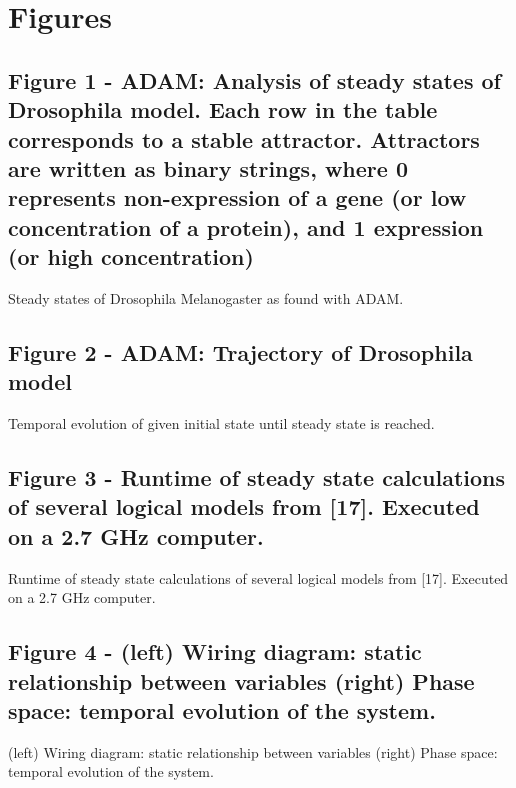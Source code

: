 \documentclass[10pt]{bmc_article}
\newenvironment{bmcformat}{\begin{raggedright}\baselineskip20pt\sloppy\setboolean{publ}{false}}{\end{raggedright}\baselineskip20pt\sloppy}
\begin{document}
\begin{bmcformat}
{
   }     %





\section*{Figures}
  \subsection*{Figure 1 - ADAM: Analysis of steady states of Drosophila model. Each row in the table corresponds to a stable attractor. Attractors are written as binary strings, where 0 represents non-expression of a gene (or low concentration of a protein), and 1 expression (or high concentration)}
      Steady states of Drosophila Melanogaster as found with ADAM.

  \subsection*{Figure 2 - ADAM: Trajectory of Drosophila model}
      Temporal evolution of given initial state until steady state is reached.

	\subsection*{Figure 3 - Runtime of steady state calculations of several logical models from [17]. Executed on a 2.7 GHz computer.}
	      Runtime of steady state calculations of several logical models from [17]. Executed on a 2.7 GHz computer.
	
		\subsection*{Figure 4 - (left) Wiring diagram: static relationship between variables (right) Phase space: temporal evolution of the system.}
		(left) Wiring diagram: static relationship between variables (right) Phase space: temporal evolution of the system.
		

\end{bmcformat}
\end{document}
